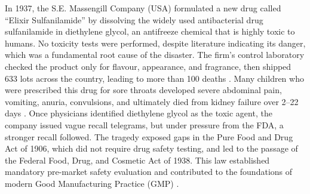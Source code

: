 In 1937, the S.E. Massengill Company (USA) formulated a new drug called ``Elixir Sulfanilamide'' by dissolving the widely used antibacterial drug sulfanilamide in diethylene glycol, an antifreeze chemical that is highly toxic to humans. No toxicity tests were performed, despite literature indicating its danger, which was a fundamental root cause of the disaster. The firm's control laboratory checked the product only for flavour, appearance, and fragrance, then shipped 633 lots across the country, leading to more than 100 deaths \cite{FDA_Sulfanilamide}. Many children who were prescribed this drug for sore throats developed severe abdominal pain, vomiting, anuria, convulsions, and ultimately died from kidney failure over 2--22 days \cite{Wax_1995}. Once physicians identified diethylene glycol as the toxic agent, the company issued vague recall telegrams, but under pressure from the FDA, a stronger recall followed. The tragedy exposed gaps in the Pure Food and Drug Act of 1906, which did not require drug safety testing, and led to the passage of the Federal Food, Drug, and Cosmetic Act of 1938. This law established mandatory pre-market safety evaluation and contributed to the foundations of modern Good Manufacturing Practice (GMP) \cite{FDA_Sulfanilamide, Wax_1995}.

